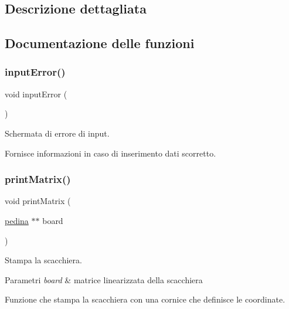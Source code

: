 \subsection{Descrizione dettagliata}


\subsection{Documentazione delle funzioni}
\mbox{\label{group__Output_gac50c67875562e21c46610e2c97525c40}} 
\subsubsection{\texorpdfstring{input\+Error()}{inputError()}}
{\footnotesize\ttfamily void input\+Error (\begin{DoxyParamCaption}{ }\end{DoxyParamCaption})}



Schermata di errore di input. 

Fornisce informazioni in caso di inserimento dati scorretto. \mbox{\label{group__Output_gac5423849c2701b9adbd33225a8a20288}} 
\subsubsection{\texorpdfstring{print\+Matrix()}{printMatrix()}}
{\footnotesize\ttfamily void print\+Matrix (\begin{DoxyParamCaption}\item[{\hyperlink{ml__lib_8h_a71fee95122b31f5cb0b07d9c16ffa3a5}{pedina} $\ast$$\ast$}]{board }\end{DoxyParamCaption})}



Stampa la scacchiera. 


\begin{DoxyParams}{Parametri}
{\em board} & matrice linearizzata della scacchiera\\
\hline
\end{DoxyParams}
Funzione che stampa la scacchiera con una cornice che definisce le coordinate. \mbox{\label{group__Output_ga724261d45664de95115edbec3fec7aef}} 
